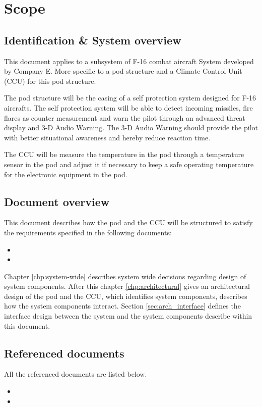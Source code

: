 
\chapter{Scope}
\label{chp:scope}

\section{Identification \& System overview}
This document applies to a subsystem of F-16 combat aircraft System developed by Company E.
More specific to a pod structure and a Climate Control Unit (CCU) for this pod structure.

The pod structure will be the casing of a self protection system designed for F-16 aircrafts.
The self protection system will be able to detect incoming missiles, fire flares as counter measurement and warn the pilot through an advanced threat display and 3-D Audio Warning.
The 3-D Audio Warning should provide the pilot with better situational awareness and hereby reduce reaction time.

The CCU will be measure the temperature in the pod through a temperature sensor in the pod and adjust it if necessary to keep a safe operating temperature for the electronic equipment in the pod.


\section{Document overview}
This document describes how the pod and the CCU will be structured to satisfy the requirements specified in the following documents:
\begin{itemize}
    \item \pcsow
    \item \momPrimeOne
\end{itemize} 
Chapter \ref{chp:system-wide} describes system wide decisions regarding design of system components. 
After this chapter \ref{chp:architectural} gives an architectural design of the pod and the CCU, which identifies system components, describes how the system components interact. 
Section \ref{sec:arch_interface} defines the interface design between the system and the system components describe within this document.

\section{Referenced documents}
All the referenced documents are listed below.
\begin{itemize}
    \item \pcsow
    \item \momPrimeOne
\end{itemize}